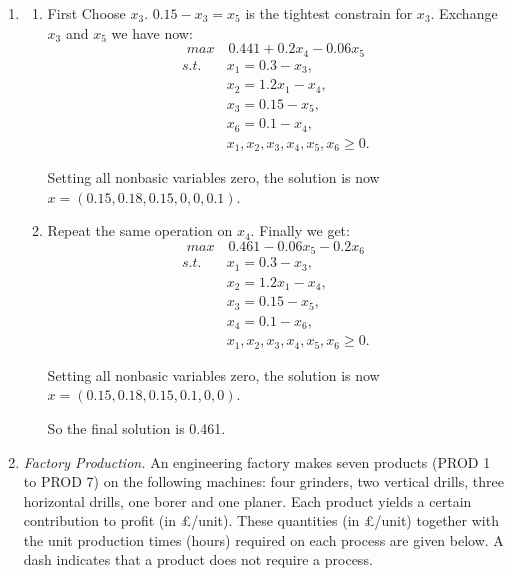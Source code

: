 \documentclass[12pt,a4paper]{article}
\makeatletter
\newtheorem*{solution}{Solution}
\theoremstyle{definition}
\renewenvironment{solution}[1][Solution] {\par\pushQED{\qed}\normalfont\topsep6\p@\@plus6\p@\relax\trivlist\item[\hskip\labelsep\bfseries#1\@addpunct{.}]\ignorespaces}{\popQED\endtrivlist\@endpefalse} \makeatother
\makeatother
\begin{document}
\begin{enumerate}
\begin{solution}
\begin{enumerate}
\begin{enumerate}
	\item
	First Choose $x_3$. $0.15 - x_3 = x_5$ is the tightest constrain for $x_3$. Exchange $x_3$ and $x_5$ we have now:
	 $$max \quad 0.441+0.2x_4 - 0.06x_5$$
	\begin{align*}
	s.t. \quad &x_1= 0.3 - x_3,\\
	&x_2= 1.2x_1 - x_4,\\
	& x_3 = 0.15 - x_5,\\
	& x_6 = 0.1 - x_4,\\
	&x_1,x_2,x_3,x_4,x_5,x_6 \geqslant 0.
	\end{align*}
	
	Setting all nonbasic variables zero, the solution is now $x = (0.15,0.18,0.15,0,0,0.1)$.
	
	\item
	Repeat the same operation on $x_4$. Finally we get:
	$$max \quad 0.461- 0.06x_5 - 0.2x_6$$
	\begin{align*}
	s.t. \quad &x_1 = 0.3 - x_3,\\
	&x_2= 1.2x_1 - x_4,\\
	& x_3 = 0.15 - x_5,\\
	& x_4 = 0.1 - x_6,\\
	&x_1,x_2,x_3,x_4,x_5,x_6 \geqslant 0.
	\end{align*}
	
	Setting all nonbasic variables zero, the solution is now $x = (0.15,0.18,0.15,0.1,0,0)$.
	
	So the final solution is 0.461.
	\end{enumerate}
	
    \end{enumerate}
    \end{solution}
    \item
    \textit{Factory Production.} An engineering factory makes seven products (PROD 1 to PROD 7) on the following machines: four grinders, two vertical drills, three horizontal drills, one borer and one planer. Each product yields a certain contribution to profit (in \pounds/unit). These quantities (in \pounds/unit) together with the unit production times (hours) required on each process are given below. A dash indicates that a product does not require a process.


\end{enumerate}
\end{document}
